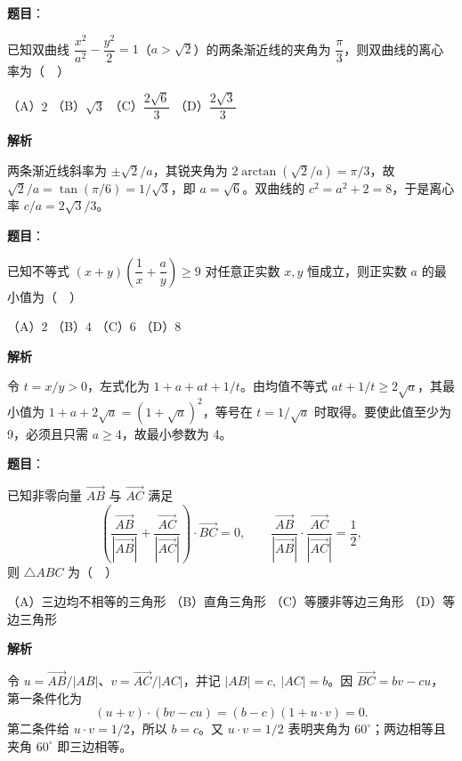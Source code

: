 \begin{answer}

\textbf{题目}：

已知双曲线 \(\dfrac{x^2}{a^2}-\dfrac{y^2}{2}=1\)（\(a>\sqrt2\)）的两条渐近线的夹角为 \(\dfrac\pi3\)，则双曲线的离心率为（　）

（A）\(2\)
（B）\(\sqrt3\)
（C）\(\dfrac{2\sqrt6}{3}\)
（D）\(\dfrac{2\sqrt3}{3}\)

\textbf{解析}

两条渐近线斜率为 \(\pm\sqrt2/a\)，其锐夹角为 \(2\arctan(\sqrt2/a)=\pi/3\)，故 \(\sqrt2/a=\tan(\pi/6)=1/\sqrt3\)，即 \(a=\sqrt6\)。双曲线的 \(c^2=a^2+2=8\)，于是离心率 \(c/a=2\sqrt3/3\)。


\end{answer}
\begin{answer}

\textbf{题目}：

已知不等式 \((x+y)\left(\dfrac1x+\dfrac a y\right)\ge9\) 对任意正实数 \(x,y\) 恒成立，则正实数 \(a\) 的最小值为（　）

（A）\(2\)
（B）\(4\)
（C）\(6\)
（D）\(8\)

\textbf{解析}

令 \(t=x/y>0\)，左式化为 \(1+a+at+1/t\)。由均值不等式 \(at+1/t\ge2\sqrt a\)，其最小值为 \(1+a+2\sqrt a=(1+\sqrt a)^2\)，等号在 \(t=1/\sqrt a\) 时取得。要使此值至少为 9，必须且只需 \(a\ge4\)，故最小参数为 4。


\end{answer}
\begin{answer}

\textbf{题目}：

已知非零向量 \(\overrightarrow{AB}\) 与 \(\overrightarrow{AC}\) 满足
\nopagebreak[4]
\[
\left(\frac{\overrightarrow{AB}}{|\overrightarrow{AB}|}+\frac{\overrightarrow{AC}}{|\overrightarrow{AC}|}\right)\cdot\overrightarrow{BC}=0,
\qquad
\frac{\overrightarrow{AB}}{|\overrightarrow{AB}|}\cdot\frac{\overrightarrow{AC}}{|\overrightarrow{AC}|}=\frac12,
\]
则 \(\triangle ABC\) 为（　）

（A）三边均不相等的三角形
（B）直角三角形
（C）等腰非等边三角形
（D）等边三角形

\textbf{解析}

令 \(u=\overrightarrow{AB}/|AB|\)、\(v=\overrightarrow{AC}/|AC|\)，并记 \(|AB|=c,\ |AC|=b\)。因 \(\overrightarrow{BC}=bv-cu\)，第一条件化为
\nopagebreak[4]
\[
(u+v)\cdot(bv-cu)=(b-c)(1+u\cdot v)=0.
\]
第二条件给 \(u\cdot v=1/2\)，所以 \(b=c\)。又 \(u\cdot v=1/2\) 表明夹角为 \(60^\circ\)；两边相等且夹角 \(60^\circ\) 即三边相等。


\end{answer}
